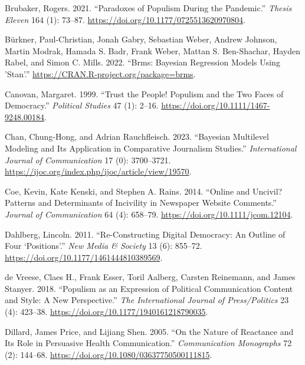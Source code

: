 \documentclass[
]{ccr}
\newlength{\cslhangindent}
\newlength{\cslentryspacingunit} %
\newenvironment{CSLReferences}[2] %
 {%
  \setlength{\parindent}{0pt}
  \ifodd #1
  \let\oldpar\par
  \def\par{\hangindent=\cslhangindent\oldpar}
  \fi
  \setlength{\parskip}{#2\cslentryspacingunit}
 }%
 {}
\begin{document}
\begin{CSLReferences}{1}{0}
\leavevmode{}%
Brubaker, Rogers. 2021. {``Paradoxes of Populism During the Pandemic.''}
\emph{Thesis Eleven} 164 (1): 73--87.
\url{https://doi.org/10.1177/0725513620970804}.

\leavevmode{}%
Bürkner, Paul-Christian, Jonah Gabry, Sebastian Weber, Andrew Johnson,
Martin Modrak, Hamada S. Badr, Frank Weber, Mattan S. Ben-Shachar,
Hayden Rabel, and Simon C. Mills. 2022. {``Brms: {Bayesian Regression
Models} Using '{Stan}'.''}
\url{https://CRAN.R-project.org/package=brms}.

\leavevmode{}%
Canovan, Margaret. 1999. {``Trust the People! {Populism} and the Two
Faces of Democracy.''} \emph{Political Studies} 47 (1): 2--16.
\url{https://doi.org/10.1111/1467-9248.00184}.

\leavevmode{}%
Chan, Chung-Hong, and Adrian Rauchfleisch. 2023. {``Bayesian {Multilevel
Modeling} and {Its Application} in {Comparative Journalism Studies}.''}
\emph{International Journal of Communication} 17 (0): 3700--3721.
\url{https://ijoc.org/index.php/ijoc/article/view/19570}.

\leavevmode{}%
Coe, Kevin, Kate Kenski, and Stephen A. Rains. 2014. {``Online and
Uncivil? {Patterns} and Determinants of Incivility in Newspaper Website
Comments.''} \emph{Journal of Communication} 64 (4): 658--79.
\url{https://doi.org/10.1111/jcom.12104}.

\leavevmode{}%
Dahlberg, Lincoln. 2011. {``Re-Constructing Digital Democracy: {An}
Outline of Four {`Positions'}.''} \emph{New Media \& Society} 13 (6):
855--72. \url{https://doi.org/10.1177/1461444810389569}.

\leavevmode{}%
de Vreese, Claes H., Frank Esser, Toril Aalberg, Carsten Reinemann, and
James Stanyer. 2018. {``Populism as an Expression of Political
Communication Content and Style: {A} New Perspective.''} \emph{The
International Journal of Press/Politics} 23 (4): 423--38.
\url{https://doi.org/10.1177/1940161218790035}.

\leavevmode{}%
Dillard, James Price, and Lijiang Shen. 2005. {``On the Nature of
Reactance and Its Role in Persuasive Health Communication.''}
\emph{Communication Monographs} 72 (2): 144--68.
\url{https://doi.org/10.1080/03637750500111815}.


\end{CSLReferences}
\end{document}
